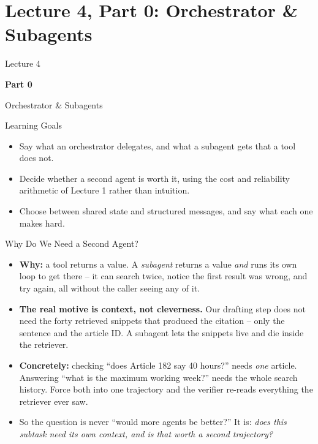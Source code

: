 \section{Lecture 4, Part 0: Orchestrator \& Subagents}

\begin{frame}
\vfill
\centering
{\color{RLBlue}\large Lecture 4}

\vspace{0.3em}
{\color{RLBlue}\Large\bfseries Part 0}

\vspace{0.6em}
{\Large Orchestrator \& Subagents}
\vfill
\end{frame}

\begin{frame}{Learning Goals}
\begin{itemize}
  \item Say what an orchestrator delegates, and what a subagent gets that a tool does not.
  \pause
  \item Decide whether a second agent is worth it, using the cost and reliability arithmetic of Lecture 1 rather than intuition.
  \pause
  \item Choose between shared state and structured messages, and say what each one makes hard.
\end{itemize}
\end{frame}

\begin{frame}{Why Do We Need a Second Agent?}
\begin{itemize}
  \item \textbf{Why:} a tool returns a value. A \emph{subagent} returns a value \emph{and} runs its own loop to get there -- it can search twice, notice the first result was wrong, and try again, all without the caller seeing any of it.
  \pause
  \item \textbf{The real motive is context, not cleverness.} Our drafting step does not need the forty retrieved snippets that produced the citation -- only the sentence and the article ID. A subagent lets the snippets live and die inside the retriever.
  \pause
  \item \textbf{Concretely:} checking ``does Article 182 say 40 hours?'' needs \emph{one} article. Answering ``what is the maximum working week?'' needs the whole search history. Force both into one trajectory and the verifier re-reads everything the retriever ever saw.
  \pause
  \item So the question is never ``would more agents be better?'' It is: \emph{does this subtask need its own context, and is that worth a second trajectory?}
\end{itemize}
\end{frame}

